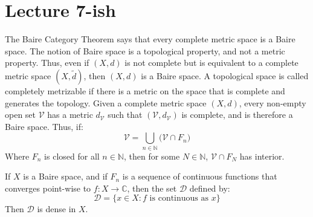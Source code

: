 \documentclass[crop=false,class=article,oneside]{standalone}
\begin{document}
    \section{Lecture 7-ish}
        The Baire Category Theorem says that every complete metric
        space is a Baire space. The notion of Baire space is a
        topological property, and not a metric property. Thus, even
        if $(X,d)$ is not complete but is equivalent to a complete
        metric space $(X,\tilde{d})$, then $(X,d)$ is a Baire space.
        A topological space is called completely metrizable if there
        is a metric on the space that is complete and generates the
        topology. Given a complete metric space $(X,d)$, every
        non-empty open set $\mathcal{V}$ has a metric
        $d_{\mathcal{V}}$ such that $(\mathcal{V},d_{\mathcal{V}})$
        is complete, and is therefore a Baire space. Thus, if:
        \begin{equation}
            \mathcal{V}=\bigcup_{n\in\mathbb{N}}\Big(
                \mathcal{V}\cap{F}_{n}\Big)
        \end{equation}
        Where $F_{n}$ is closed for all $n\in\mathbb{N}$, then
        for some $N\in\mathbb{N}$, $\mathcal{V}\cap{F}_{N}$ has
        interior.
        \begin{theorem}
            If $X$ is a Baire space, and if
            $F_{n}$ is a sequence of continuous functions that
            converges point-wise to $f:X\rightarrow\mathbb{C}$, then
            the set $\mathcal{D}$ defined by:
            \begin{equation}
                \mathcal{D}=
                    \{x\in{X}:\textrm{$f$ is continuous as $x$}\}
            \end{equation}
            Then $\mathcal{D}$ is dense in $X$.
        \end{theorem}
\end{document}
